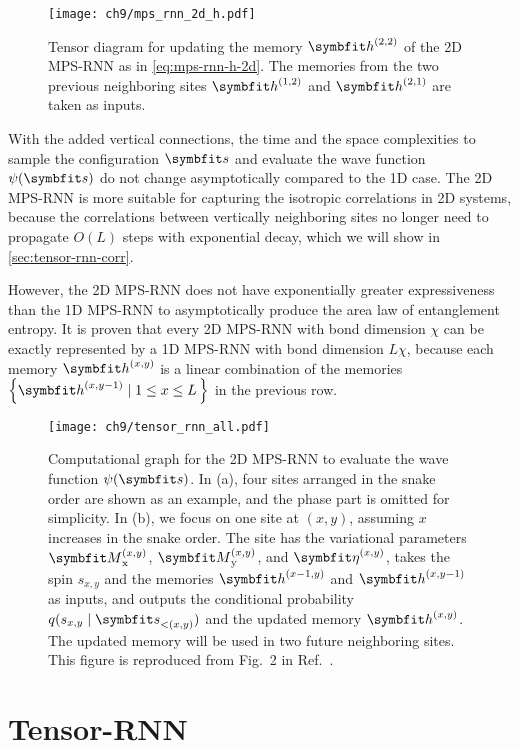 \begin{figure}[htb]
\centering
\texttt{[image: ch9/mps\_rnn\_2d\_h.pdf]}
\caption[Tensor diagram for memory update of 2D MPS-RNN]{
Tensor diagram for updating the memory $\vh^{(2, 2)}$ of the 2D MPS-RNN as in \cref{eq:mps-rnn-h-2d}.
The memories from the two previous neighboring sites $\vh^{(1, 2)}$ and $\vh^{(2, 1)}$ are taken as inputs.
}
\label{fig:mps-rnn-h-2d}
\end{figure}

With the added vertical connections, the time and the space complexities to sample the configuration $\vs$ and evaluate the wave function $\psi(\vs)$ do not change asymptotically compared to the 1D case. The 2D MPS-RNN is more suitable for capturing the isotropic correlations in 2D systems, because the correlations between vertically neighboring sites no longer need to propagate $O(L)$ steps with exponential decay, which we will show in \cref{sec:tensor-rnn-corr}.

However, the 2D MPS-RNN does not have exponentially greater expressiveness than the 1D MPS-RNN to asymptotically produce the area law of entanglement entropy. It is proven that every 2D MPS-RNN with bond dimension $\chi$ can be exactly represented by a 1D MPS-RNN with bond dimension $L \chi$, because each memory $\vh^{(x, y)}$ is a linear combination of the memories $\left\{ \vh^{(x, y - 1)} \mid 1 \le x \le L\,\right\}$ in the previous row.

\begin{figure}[htb]
\centering
\texttt{[image: ch9/tensor\_rnn\_all.pdf]}
\caption[Computational graph for 2D MPS-RNN]{
Computational graph for the 2D MPS-RNN to evaluate the wave function $\psi(\vs)$.
In (a), four sites arranged in the snake order are shown as an example, and the phase part is omitted for simplicity.
In (b), we focus on one site at $(x, y)$, assuming $x$ increases in the snake order.
The site has the variational parameters $\mM^{(x, y)}_\text{x}$, $\mM^{(x, y)}_\text{y}$, and $\vet^{(x, y)}$, takes the spin $s_{x, y}$ and the memories $\vh^{(x - 1, y)}$ and $\vh^{(x, y - 1)}$ as inputs, and outputs the conditional probability $q(s_{x, y} \mid \vs_{< (x, y)})$ and the updated memory $\vh^{(x, y)}$.
The updated memory will be used in two future neighboring sites.
This figure is reproduced from Fig.~2 in Ref.~\cite{wu2023tensor}.
}
\label{fig:tensor-rnn-all}
\end{figure}

\section{Tensor-RNN}
\label{sec:tensor-rnn}


